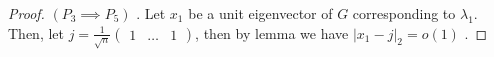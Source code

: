 \begin{proof}
	\(\left( P_3 \implies P_5 \right) \) . Let \(x_1\)  be a unit eigenvector of \(G\)  corresponding to \(\lambda_1\). Then, let \(j = \frac{1}{\sqrt{n} }\begin{pmatrix} 1 &  \hdots & 1 \end{pmatrix}\), then by lemma we have \(\left| x_1 - j \right|_{2} = o\left( 1 \right) \) .
\end{proof}
